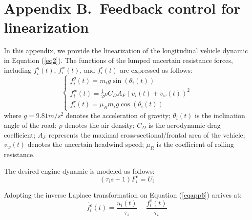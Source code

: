 \documentclass[a4paper]{cas-sc}
\begin{document}
\section*{Appendix B.~Feedback control for linearization}
\label{AppendixB}
In this appendix, we provide the linearization of the longitudinal vehicle dynamic in Equation (\ref{eq2}). The functions of the lumped uncertain resistance forces, including $f_i^g(t)$, $f_i^w(t)$, and $f_i^r(t)$ are expressed as follows:
\begin{equation}
  \left\{\begin{array}{l}
    f_{i}^{g}(t)=m_{i} g \sin \left(\theta_{i}(t)\right)                        \\
    f_{i}^{w}(t)=\frac{1}{2} \rho C_{D} A_{F}\left(v_{i}(t)+v_{w}(t)\right)^{2} \\
    f_{i}^{r}(t)=\mu_{R} m_{i} g \cos \left(\theta_{i}(t)\right)
  \end{array}\right.
  \label{eqapp5}
\end{equation}
where $g=9.81m/s^2$ denotes the acceleration of gravity; $\theta_i(t)$ is the inclination angle of the road; $\rho$ denotes the air density; $C_D$ is the aerodynamic drag coefficient; $A_F$ represents the maximal cross-sectional/frontal area of the vehicle; $v_w(t)$ denotes the uncertain headwind speed; $\mu_R$ is the coefficient of rolling resistance.

The desired engine dynamic is modeled as follows:
\begin{equation}
  (\tau_is+1)F_i^e=U_i
  \label{eqapp6}
\end{equation}

Adopting the inverse Laplace transformation on Equation (\ref{eqapp6}) arrives at:
\begin{equation}
  \dot{f_i^e}\left(t\right)=\frac{u_i(t)}{\tau_i}-\frac{f_i^e\left(t\right)}{\tau_i}
  \label{eqapp7}
\end{equation}
\end{document}
